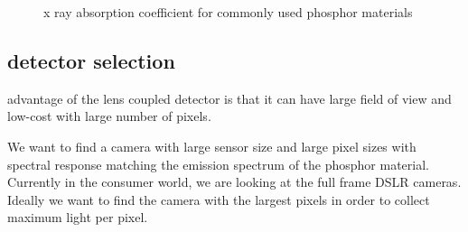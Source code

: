 \begin{figure}
\centering
{}
\caption{x ray absorption coefficient for commonly used phosphor materials}
\label{fig:absorptioncoeff}
\end{figure}


\subsection{detector selection}
advantage of the lens coupled detector is that it can have large field of view and low-cost with large number of pixels.

We want to find a camera with large sensor size and large pixel sizes with spectral response matching the emission spectrum of the phosphor material.  Currently in the consumer world, we are looking at the full frame DSLR cameras.  Ideally we want to find the camera with the largest pixels in order to collect maximum light per pixel.


